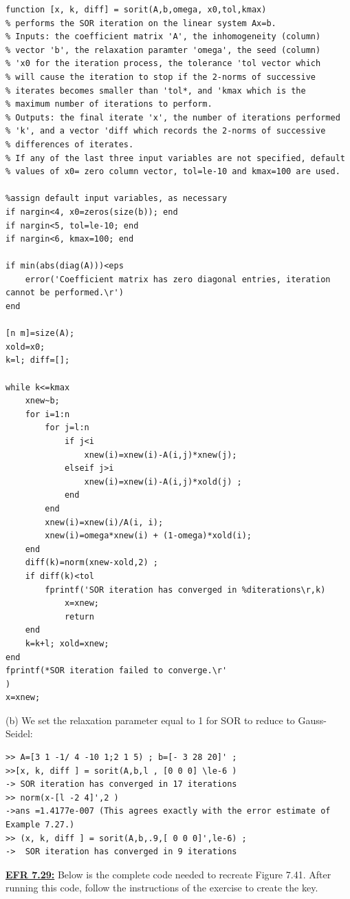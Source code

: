 \documentclass[../main.tex]{subfiles}
\begin{document}
\begin{lstlisting}[numbers=none]
function [x, k, diff] = sorit(A,b,omega, x0,tol,kmax) 
% performs the SOR iteration on the linear system Ax=b. 
% Inputs: the coefficient matrix 'A', the inhomogeneity (column) 
% vector 'b', the relaxation paramter 'omega', the seed (column) 
% 'x0 for the iteration process, the tolerance 'tol vector which 
% will cause the iteration to stop if the 2-norms of successive 
% iterates becomes smaller than 'tol*, and 'kmax which is the 
% maximum number of iterations to perform. 
% Outputs: the final iterate 'x', the number of iterations performed 
% 'k', and a vector 'diff which records the 2-norms of successive 
% differences of iterates. 
% If any of the last three input variables are not specified, default 
% values of x0= zero column vector, tol=le-10 and kmax=100 are used. 

%assign default input variables, as necessary 
if nargin<4, x0=zeros(size(b)); end 
if nargin<5, tol=le-10; end 
if nargin<6, kmax=100; end 

if min(abs(diag(A)))<eps 
	error('Coefficient matrix has zero diagonal entries, iteration 
cannot be performed.\r') 
end 

[n m]=size(A); 
xold=x0; 
k=l; diff=[]; 

while k<=kmax 
	xnew~b; 
	for i=1:n  
		for j=l:n
			if j<i 
				xnew(i)=xnew(i)-A(i,j)*xnew(j); 
			elseif j>i 
				xnew(i)=xnew(i)-A(i,j)*xold(j) ; 
			end 
		end 
		xnew(i)=xnew(i)/A(i, i); 
		xnew(i)=omega*xnew(i) + (1-omega)*xold(i); 
	end
	diff(k)=norm(xnew-xold,2) ; 
	if diff(k)<tol 
		fprintf('SOR iteration has converged in %diterations\r,k) 
			x=xnew; 
			return 
	end
	k=k+l; xold=xnew; 
end 
fprintf(*SOR iteration failed to converge.\r'
) 
x=xnew; 
\end{lstlisting}
(b) We set the relaxation parameter equal to 1 for SOR to reduce to Gauss-Seidel: 
\begin{lstlisting}[numbers=none,frame=none]
>> A=[3 1 -1/ 4 -10 1;2 1 5) ; b=[- 3 28 20]' ; 
>>[x, k, diff ] = sorit(A,b,l , [0 0 0] \le-6 ) 
-> SOR iteration has converged in 17 iterations 
>> norm(x-[l -2 4]',2 ) 
->ans =1.4177e-007 (This agrees exactly with the error estimate of Example 7.27.) 
>> (x, k, diff ] = sorit(A,b,.9,[ 0 0 0]',le-6) ; 
->	SOR iteration has converged in 9 iterations
\end{lstlisting}
\textbf{\underline{EFR 7.29:}} Below is the complete code needed to recreate Figure 7.41. After running this code, 
follow the instructions of the exercise to create the key.
\end{document}
